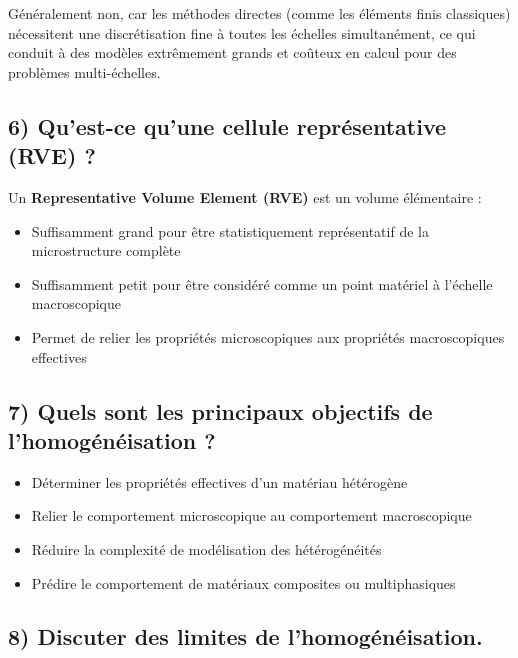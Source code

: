 \documentclass{rapportECL}
\begin{document}
\begin{tcolorbox}[colback=white!5!white,colframe=blue!75!black]
Généralement non, car les méthodes directes (comme les éléments finis classiques) nécessitent une discrétisation fine à toutes les échelles simultanément, ce qui conduit à des modèles extrêmement grands et coûteux en calcul pour des problèmes multi-échelles.
\end{tcolorbox}

\subsection*{6) Qu'est-ce qu'une cellule représentative (RVE) ?}

\begin{tcolorbox}[colback=white!5!white,colframe=blue!75!black]
Un \textbf{Representative Volume Element (RVE)} est un volume élémentaire :
\begin{itemize}[noitemsep]
\item Suffisamment grand pour être statistiquement représentatif de la microstructure complète
\item Suffisamment petit pour être considéré comme un point matériel à l'échelle macroscopique
\item Permet de relier les propriétés microscopiques aux propriétés macroscopiques effectives
\end{itemize}
\end{tcolorbox}

\subsection*{7) Quels sont les principaux objectifs de l'homogénéisation ?}

\begin{tcolorbox}[colback=white!5!white,colframe=blue!75!black]
\begin{itemize}[noitemsep]
\item Déterminer les propriétés effectives d'un matériau hétérogène
\item Relier le comportement microscopique au comportement macroscopique
\item Réduire la complexité de modélisation des hétérogénéités
\item Prédire le comportement de matériaux composites ou multiphasiques
\end{itemize}
\end{tcolorbox}

\subsection*{8) Discuter des limites de l'homogénéisation.}
\end{document}
